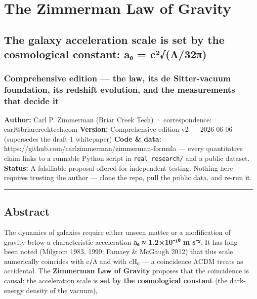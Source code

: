 \documentclass[
]{article}
\author{}
\date{}
\begin{document}
\section{The Zimmerman Law of
Gravity}\label{the-zimmerman-law-of-gravity}

\subsection{The galaxy acceleration scale is set by the cosmological
constant: a₀ =
c²√(Λ/32π)}\label{the-galaxy-acceleration-scale-is-set-by-the-cosmological-constant-aux2080-cuxb2ux3bb32ux3c0}

\subsubsection{Comprehensive edition --- the law, its de Sitter-vacuum
foundation, its redshift evolution, and the measurements that decide
it}\label{comprehensive-edition-the-law-its-de-sitter-vacuum-foundation-its-redshift-evolution-and-the-measurements-that-decide-it}

\textbf{Author:} Carl P. Zimmerman (Briar Creek Tech) · correspondence:
carl@briarcreektech.com \textbf{Version:} Comprehensive edition v2 ---
2026-06-06 (supersedes the draft-1 whitepaper) \textbf{Code \& data:}
https://github.com/carlzimmerman/zimmerman-formula --- every
quantitative claim links to a runnable Python script in
\texttt{real\_research/} and a public dataset. \textbf{Status:} A
falsifiable proposal offered for independent testing. Nothing here
requires trusting the author --- clone the repo, pull the public data,
and re-run it.

\begin{center}\rule{0.5\linewidth}{0.5pt}\end{center}

\subsection{Abstract}\label{abstract}

The dynamics of galaxies require either unseen matter or a modification
of gravity below a characteristic acceleration \textbf{a₀ ≈ 1.2×10⁻¹⁰ m
s⁻²}. It has long been noted (Milgrom 1983, 1999; Famaey \& McGaugh
2012) that this scale numerically coincides with c√Λ and with cH₀ --- a
coincidence ΛCDM treats as accidental. The \textbf{Zimmerman Law of
Gravity} proposes that the coincidence is causal: the acceleration scale
is \textbf{set by the cosmological constant} (the dark-energy density of
the vacuum),
\end{document}
